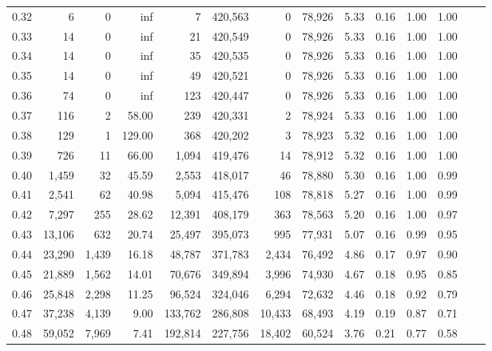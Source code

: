 \begin{tabular}{rrrrrrrrrrrrrr}
0.32 &       6 &       0 &     inf &        7 &  420,563 &       0 &  78,926 &  5.33 &  0.16 &  1.00 &      1.00 \\
0.33 &      14 &       0 &     inf &       21 &  420,549 &       0 &  78,926 &  5.33 &  0.16 &  1.00 &      1.00 \\
0.34 &      14 &       0 &     inf &       35 &  420,535 &       0 &  78,926 &  5.33 &  0.16 &  1.00 &      1.00 \\
0.35 &      14 &       0 &     inf &       49 &  420,521 &       0 &  78,926 &  5.33 &  0.16 &  1.00 &      1.00 \\
0.36 &      74 &       0 &     inf &      123 &  420,447 &       0 &  78,926 &  5.33 &  0.16 &  1.00 &      1.00 \\
0.37 &     116 &       2 &   58.00 &      239 &  420,331 &       2 &  78,924 &  5.33 &  0.16 &  1.00 &      1.00 \\
0.38 &     129 &       1 &  129.00 &      368 &  420,202 &       3 &  78,923 &  5.32 &  0.16 &  1.00 &      1.00 \\
0.39 &     726 &      11 &   66.00 &    1,094 &  419,476 &      14 &  78,912 &  5.32 &  0.16 &  1.00 &      1.00 \\
0.40 &   1,459 &      32 &   45.59 &    2,553 &  418,017 &      46 &  78,880 &  5.30 &  0.16 &  1.00 &      0.99 \\
0.41 &   2,541 &      62 &   40.98 &    5,094 &  415,476 &     108 &  78,818 &  5.27 &  0.16 &  1.00 &      0.99 \\
0.42 &   7,297 &     255 &   28.62 &   12,391 &  408,179 &     363 &  78,563 &  5.20 &  0.16 &  1.00 &      0.97 \\
0.43 &  13,106 &     632 &   20.74 &   25,497 &  395,073 &     995 &  77,931 &  5.07 &  0.16 &  0.99 &      0.95 \\
0.44 &  23,290 &   1,439 &   16.18 &   48,787 &  371,783 &   2,434 &  76,492 &  4.86 &  0.17 &  0.97 &      0.90 \\
0.45 &  21,889 &   1,562 &   14.01 &   70,676 &  349,894 &   3,996 &  74,930 &  4.67 &  0.18 &  0.95 &      0.85 \\
0.46 &  25,848 &   2,298 &   11.25 &   96,524 &  324,046 &   6,294 &  72,632 &  4.46 &  0.18 &  0.92 &      0.79 \\
0.47 &  37,238 &   4,139 &    9.00 &  133,762 &  286,808 &  10,433 &  68,493 &  4.19 &  0.19 &  0.87 &      0.71 \\
0.48 &  59,052 &   7,969 &    7.41 &  192,814 &  227,756 &  18,402 &  60,524 &  3.76 &  0.21 &  0.77 &      0.58 \\

\end{tabular}
